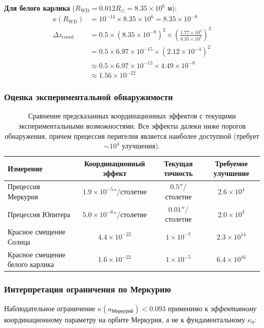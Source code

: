 \documentclass[11pt,a4paper]{article}
\begin{document}
	\textbf{Для белого карлика} ($R_{\text{WD}} = 0.012 R_\odot = 8.35 \times 10^6$ м):
	\begin{align}
		\kappa(R_{\text{WD}}) &= 10^{-14} \times 8.35 \times 10^6 = 8.35 \times 10^{-8} \\
		\Delta z_{\text{coord}} &= 0.5 \times (8.35 \times 10^{-8})^2 \times \left(\frac{1.77 \times 10^3}{8.35 \times 10^6}\right)^2 \\
		&= 0.5 \times 6.97 \times 10^{-15} \times (2.12 \times 10^{-4})^2 \\
		&\approx 0.5 \times 6.97 \times 10^{-15} \times 4.49 \times 10^{-8} \\
		&\approx 1.56 \times 10^{-22}
	\end{align}
	
	\subsubsection{Оценка экспериментальной обнаружимости}
	
	\begin{table}[htbp]
		\centering
		\begin{tabular}{lccc}
			\toprule
			\textbf{Измерение} & \textbf{Координационный эффект} & \textbf{Текущая точность} & \textbf{Требуемое улучшение} \\
			\midrule
			Прецессия Меркурия & $1.9 \times 10^{-5}$''/столетие & $0.5''$/столетие & $2.6 \times 10^4$ \\
			Прецессия Юпитера & $5.0 \times 10^{-6}$''/столетие & $0.01''$/столетие & $2.0 \times 10^3$ \\
			Красное смещение Солнца & $4.4 \times 10^{-22}$ & $1 \times 10^{-7}$ & $2.3 \times 10^{14}$ \\
			Красное смещение белого карлика & $1.6 \times 10^{-22}$ & $1 \times 10^{-5}$ & $6.4 \times 10^{16}$ \\
			\bottomrule
		\end{tabular}
		\caption{Сравнение предсказанных координационных эффектов с текущими экспериментальными возможностями. 
			Все эффекты далеки ниже порогов обнаружения, причем прецессия перигелия является наиболее 
			доступной (требует $\sim 10^4$ улучшения).}
	\end{table}
	
	\subsubsection{Интерпретация ограничения по Меркурию}
	
	Наблюдательное ограничение $\kappa(a_{\text{Меркурий}}) < 0.093$ применимо к 
	\textit{эффективному} координационному параметру на орбите Меркурия, а не к фундаментальному $\kappa_0$:
	
\end{document}
